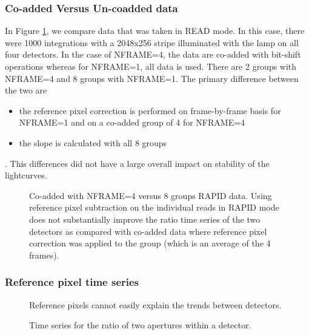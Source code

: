 \documentclass{aastex62}
\begin{document}
\clearpage
\subsubsection{Co-added Versus Un-coadded data}\label{sec:coadds}
In Figure \ref{fig:coaddedData}, we compare data that was taken in READ mode.
In this case, there were 1000 integrations with a 2048x256 stripe illuminated with the lamp on all four detectors.
In the case of NFRAME=4, the data are co-added with bit-shift operations whereas for NFRAME=1, all data is used.
There are 2 groups with NFRAME=4 and 8 groups with NFRAME=1.
The primary difference between the two are
\begin{itemize}
\item the reference pixel correction is performed on frame-by-frame basis for NFRAME=1 and on a co-added group of 4 for NFRAME=4
\item the slope is calculated with all 8 groups
\end{itemize}.
This differences did not have a large overall impact on stability of the lightcurves.

\begin{figure}
{}
\caption{Co-added with NFRAME=4 versus 8 groups RAPID data.
Using reference pixel subtraction on the individual reads in RAPID mode does not substantially improve the ratio time series of the two detectors as compared with co-added data where reference pixel correction was applied to the group (which is an average of the 4 frames).}\label{fig:coaddedData}
\end{figure}


\clearpage
\subsubsection{Reference pixel time series}
\begin{figure}
{}
\caption{Reference pixels cannot easily explain the trends between detectors.}\label{fig:refpixTSeries}
\end{figure}

\begin{figure}
{}
{}
\caption{Time series for the ratio of two apertures within a detector.}\label{fig:allanVarianceWithinDetector}
\end{figure}
\end{document}
